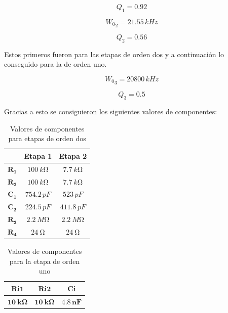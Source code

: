 \begin{equation}
	Q_1 = 0.92
\end{equation}

\begin{equation}
	{W_0}_2 = 21.55 \, kHz
\end{equation}

\begin{equation}
	Q_2 = 0.56
\end{equation}

	Estos primeros fueron para las etapas de orden dos y a continuación lo conseguido para la de orden uno.

\begin{equation}
	{W_0}_3 = 20800 \, kHz
\end{equation}

\begin{equation}
	Q_3 = 0.5
\end{equation}

	Gracias a esto se consiguieron los siguientes valores de componentes:
\begin{table}[H]
\centering
\begin{tabular}{|c|c|c|}
\hline
            & \textbf{Etapa 1} & \textbf{Etapa 2} \\ \hline
$\mathbf{R_1}$ & $\SI{100}{k\ohm}$               & $\SI{7.7}{k\ohm}$             \\ \hline
$\mathbf{R_2}$ & $\SI{100}{k\ohm}$               & $\SI{7.7}{k\ohm}$             \\ \hline
$\mathbf{C_1}$ & $754.2 \, pF$             & $523 \, pF$              \\ \hline
$\mathbf{C_2}$ & $224.5 \, pF$           & $411.8 \, pF$             \\ \hline
$\mathbf{R_3}$ & $\SI{2.2}{M\ohm}$             & $\SI{2.2}{M\ohm}$             \\ \hline
$\mathbf{R_4}$ & $\SI{24}{\ohm}$             & $\SI{24}{\ohm}$             \\ \hline
\end{tabular}
\caption{Valores de componentes para etapas de orden dos}
\label{tabla:legendreetapasorden2}
\end{table}

\begin{table}[H]
\centering
\begin{tabular}{|c|c|c|}
\hline
$\mathbf{Ri1}$ & $\mathbf{Ri2}$ & $\mathbf{Ci}$     \\ \hline
$\mathbf{\SI{10}{k\ohm}}$ & $\mathbf{\SI{10}{k\ohm}}$ & $\mathbf{4.8 \, nF}$ \\ \hline
\end{tabular}
\caption{Valores de componentes para la etapa de orden uno}
\label{tabla:besseletapaorden1}
\end{table}

